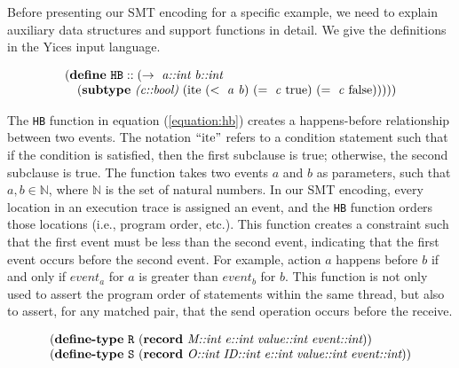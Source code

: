 Before presenting our SMT encoding for a specific example, we need to explain auxiliary data structures and support functions in detail. We give the definitions in the Yices \cite{dutertre:CAV06} input language.

\begin{equation}
\begin{array}{l}
(\textbf{define}\ \mathtt{HB}::(\rightarrow\ \emph{a::int}\ \emph{b::int}\\
\ \ \ (\textbf{subtype}\ \emph{(c::bool)}\ (\mathrm{ite}\ (<\ \mathit{a}\ \mathit{b})\ (=\ \mathit{c}\ \mathrm{true})\ (=\ \mathit{c}\ \mathrm{false})))))
\end{array}
\label{equation:hb}
\end{equation}


The \texttt{HB} function in equation (\ref{equation:hb}) creates a happens-before relationship between two events. The notation $``\mathrm{ite}"$ refers to a condition statement such that if the condition is satisfied, then the first subclause is true; otherwise, the second subclause is true. The function takes two events $a$ and $b$ as parameters, such that $a,b \in \mathbb{N}$, where $\mathbb{N}$ is the set of natural numbers. In our SMT encoding, every location in an execution trace is assigned an event, and the \texttt{HB} function orders those locations (i.e., program order, etc.). This function creates a constraint such that the first event must be less than the second event, indicating that the first event occurs before the second event. For example, action $a$ happens before $b$ if and only if $\mathit{event}_a$ for $a$ is greater than $\mathit{event}_b$ for $b$. This function is not only used to assert the program order of statements within the same thread, but also to assert, for any matched pair, that the send operation
occurs before the receive.

\begin{equation}
\begin{array}{l}
(\textbf{define-type}\ \texttt{R}\ (\textbf{record}\ \emph{M::int}\ \emph{e::int}\ \emph{value::int}\ \emph{event::int})) \\
(\textbf{define-type}\ \texttt{S}\ (\textbf{record}\ \emph{O::int}\ \emph{ID::int}\ \emph{e::int}\ \emph{value::int}\ \emph{event::int}))
\end{array}
\label{equation:record}
\end{equation}

